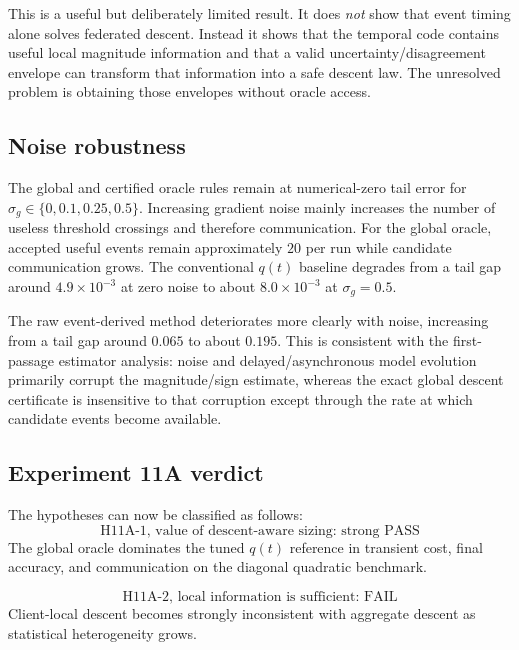 This is a useful but deliberately limited result. It does \emph{not} show that event timing alone solves federated descent. Instead it shows that the temporal code contains useful local magnitude information and that a valid uncertainty/disagreement envelope can transform that information into a safe descent law. The unresolved problem is obtaining those envelopes without oracle access.

\subsection{Noise robustness}

The global and certified oracle rules remain at numerical-zero tail error for $\sigma_g\in\{0,0.1,0.25,0.5\}$. Increasing gradient noise mainly increases the number of useless threshold crossings and therefore communication. For the global oracle, accepted useful events remain approximately $20$ per run while candidate communication grows. The conventional $q(t)$ baseline degrades from a tail gap around $4.9\times10^{-3}$ at zero noise to about $8.0\times10^{-3}$ at $\sigma_g=0.5$.

The raw event-derived method deteriorates more clearly with noise, increasing from a tail gap around $0.065$ to about $0.195$. This is consistent with the first-passage estimator analysis: noise and delayed/asynchronous model evolution primarily corrupt the magnitude/sign estimate, whereas the exact global descent certificate is insensitive to that corruption except through the rate at which candidate events become available.

\subsection{Experiment 11A verdict}

The hypotheses can now be classified as follows:
\begin{equation}
  \boxed{\text{H11A-1, value of descent-aware sizing: strong PASS}}
\end{equation}
The global oracle dominates the tuned $q(t)$ reference in transient cost, final accuracy, and communication on the diagonal quadratic benchmark.

\begin{equation}
  \boxed{\text{H11A-2, local information is sufficient: FAIL}}
\end{equation}
Client-local descent becomes strongly inconsistent with aggregate descent as statistical heterogeneity grows.

